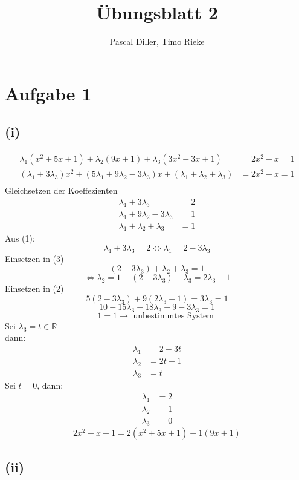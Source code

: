 \documentclass{article}
\title{Übungsblatt 2}
\author{Pascal Diller, Timo Rieke}
\begin{document}
\maketitle

\section*{Aufgabe 1}
\subsection*{(i)}
\begin{align*}
    \lambda_1 (x^2 + 5x + 1) + \lambda_2 (9x + 1) + \lambda_3 (3x^2 - 3x + 1) &= 2x^2 + x = 1 \\
     (\lambda_1 + 3 \lambda_3)x^2 + (5 \lambda_1 + 9 \lambda_2 - 3 \lambda_3)x + (\lambda_1 + \lambda_2 + \lambda_3) &= 2x^2 + x = 1 \\
\end{align*}
Gleichsetzen der Koeffezienten
\begin{align}
    \lambda_1 + 3 \lambda_3 &= 2 \\ 
    \lambda_1 + 9 \lambda_2 - 3 \lambda_3 &= 1 \\
    \lambda_1 + \lambda_2 + \lambda_3 &= 1
\end{align}
Aus (1):
\[\lambda_1 + 3 \lambda_3 = 2 \Leftrightarrow \lambda_1 = 2 - 3 \lambda_3\]
Einsetzen in (3)
\[(2 - 3 \lambda_3) + \lambda_2 + \lambda_3 = 1\]
\[\Leftrightarrow \lambda_2 = 1 - (2 - 3\lambda_3) - \lambda_3 = 2 \lambda_3 - 1\]
Einsetzen in (2)
\[5(2 - 3 \lambda_3) + 9(2 \lambda_3 - 1) = 3 \lambda_3 = 1\]
\[10-15 \lambda_3 + 18 \lambda_3 - 9 - 3 \lambda_3 = 1\]
\[1 = 1 \rightarrow \text{ unbestimmtes System }\] 
Sei $\lambda_3 = t \in \mathbb{R}$ \\
dann:
\begin{align*}
    \lambda_1 &= 2 - 3t \\
    \lambda_2 &= 2t - 1 \\
    \lambda_3 &= t
\end{align*}
Sei $t = 0$, dann:
\begin{align*}
    \lambda_1 &= 2  \\
    \lambda_2 &= 1 \\
    \lambda_3 &= 0
\end{align*}
\[2x^2 + x + 1 = 2 (x^2 + 5x + 1) + 1 (9x + 1)\]

\subsection*{(ii)}
\end{document}
